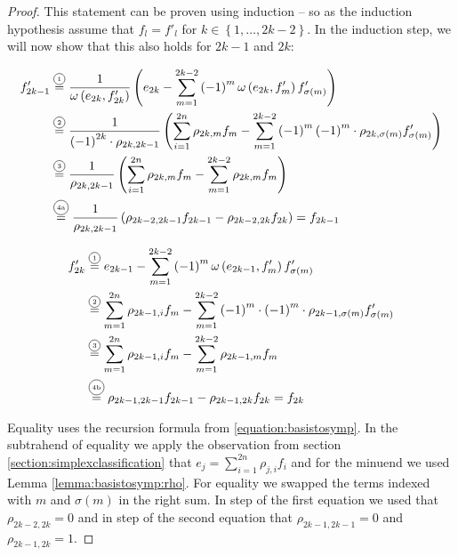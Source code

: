 \documentclass[../SymplecticSimplices.tex]{subfiles}
\begin{document}
\begin{proof}
  This statement can be proven using induction -- so as the induction hypothesis assume that \( f_{l} = f'_{l} \) for \( k \in \left\lbrace 1, \dots, 2k - 2 \right\rbrace \). In the induction step, we will now show that this also holds for \( 2k-1 \) and \( 2k \):

  \begin{equation*}
    \begin{split}
      f'_{2k-1} & \eqcom{1} \frac{1}{\omega \left( e_{2k}, f'_{2k} \right)} \left( e_{2k} - \sum \limits _{m=1}^{2k-2} \left( -1 \right)^{m} \omega \left( e_{2k}, f'_m \right) f'_{\sigma \left( m \right)} \right) \\
               & \eqcom{2} \frac{1}{\left( -1 \right)^{2k} \cdot \rho_{2k, 2k-1}} \left( \sum_{i=1}^{2n} \rho_{2k,m} f_m - \sum \limits _{m=1}^{2k-2} \left( -1 \right)^{m} \left( -1 \right)^m \cdot \rho_{2k, \sigma \left( m \right)} f'_{\sigma \left( m \right)} \right) \\
               & \eqcom{3} \frac{1}{\rho_{2k, 2k-1}} \left( \sum_{i=1}^{2n} \rho_{2k,m} f_m - \sum \limits _{m=1}^{2k-2} \rho_{2k, m} f_{m} \right) \\
               & \eqcom{4a} \frac{1}{\rho_{2k, 2k-1}} \left( \rho_{2k-2,2k-1} f_{2k-1} - \rho_{2k-2,2k} f_{2k} \right) = f_{2k-1}
    \end{split}
  \end{equation*}

  \begin{equation*}
    \begin{split}
      f'_{2k} & \eqcom{1} e_{2k-1} - \sum \limits _{m=1}^{2k-2} \left( -1 \right)^{m} \omega \left( e_{2k-1}, f'_m \right) f'_{\sigma \left( m \right)} \\
              & \eqcom{2} \sum_{m=1}^{2n} \rho_{2k-1,i} f_m - \sum \limits _{m=1}^{2k-2} \left( -1 \right)^{m} \cdot \left( -1 \right)^m \cdot \rho_{2k-1, \sigma \left( m \right)} f'_{\sigma \left( m \right)} \\
              & \eqcom{3} \sum_{m=1}^{2n} \rho_{2k-1,i} f_m - \sum \limits _{m=1}^{2k-2} \rho_{2k-1, m} f_{m} \\
              & \eqcom{4b} \rho_{2k-1,2k-1} f_{2k-1} - \rho_{2k-1,2k} f_{2k} = f_{2k}
    \end{split}
  \end{equation*}
  
  Equality  uses the recursion formula from \eqref{equation:basistosymp}. In the subtrahend of equality  we apply the observation from section \ref{section:simplexclassification} that \( e_j = \sum_{i=1}^{2n} \rho_{j,i} f_i \) and for the minuend we used Lemma \ref{lemma:basistosymp:rho}. For equality  we swapped the terms indexed with \( m \) and \( \sigma \left( m \right) \) in the right sum. In step  of the first equation we used that \( \rho_{2k-2,2k} = 0 \) and in step  of the second equation that \( \rho_{2k-1,2k-1} = 0 \) and \( \rho_{2k-1,2k} = 1 \).
\end{proof}
\end{document}
